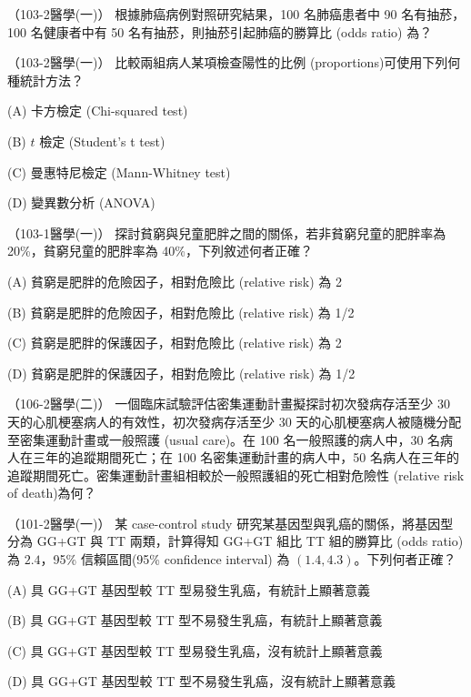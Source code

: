     \begin{docexam}{（103-2醫學(一)）}
        根據肺癌病例對照研究結果，100 名肺癌患者中 90 名有抽菸，100 名健康者中有 50 名有抽菸，則抽菸引起肺癌的勝算比 (odds ratio) 為？
    \end{docexam}
    
    \begin{docexam}{（103-2醫學(一)）}
        比較兩組病人某項檢查陽性的比例 (proportions)可使用下列何種統計方法？
        
        (A) 卡方檢定 (Chi-squared test)
        
        (B) $t$ 檢定 (Student's t test)

        (C) 曼惠特尼檢定 (Mann-Whitney test)
 
        (D) 變異數分析 (ANOVA)
    \end{docexam}
    
    \begin{docexam}{（103-1醫學(一)）}
        探討貧窮與兒童肥胖之間的關係，若非貧窮兒童的肥胖率為 20\%，貧窮兒童的肥胖率為 40\%，下列敘述何者正確？
        
        (A) 貧窮是肥胖的危險因子，相對危險比 (relative risk) 為 2
        
        (B) 貧窮是肥胖的危險因子，相對危險比 (relative risk) 為 1/2

        (C) 貧窮是肥胖的保護因子，相對危險比 (relative risk) 為 2
 
        (D) 貧窮是肥胖的保護因子，相對危險比 (relative risk) 為 1/2
    \end{docexam}
    
    \begin{docexam}{（106-2醫學(二)）}
        一個臨床試驗評估密集運動計畫擬探討初次發病存活至少 30 天的心肌梗塞病人的有效性，初次發病存活至少 30 天的心肌梗塞病人被隨機分配至密集運動計畫或一般照護 (usual care)。在 100 名一般照護的病人中，30 名病人在三年的追蹤期間死亡；在 100 名密集運動計畫的病人中，50 名病人在三年的追蹤期間死亡。密集運動計畫組相較於一般照護組的死亡相對危險性 (relative risk of death)為何？
    \end{docexam}
    
    \begin{docexam}{（101-2醫學(一)）}
        某 case-control study 研究某基因型與乳癌的關係，將基因型分為 GG+GT 與 TT 兩類，計算得知 GG+GT 組比 TT 組的勝算比 (odds ratio) 為 $2.4$，95\% 信賴區間(95\% confidence interval) 為 $(1.4, 4.3)$。下列何者正確？
        
        (A) 具 GG+GT 基因型較 TT 型易發生乳癌，有統計上顯著意義
        
        (B) 具 GG+GT 基因型較 TT 型不易發生乳癌，有統計上顯著意義

        (C) 具 GG+GT 基因型較 TT 型易發生乳癌，沒有統計上顯著意義
 
        (D) 具 GG+GT 基因型較 TT 型不易發生乳癌，沒有統計上顯著意義
    \end{docexam}
    
